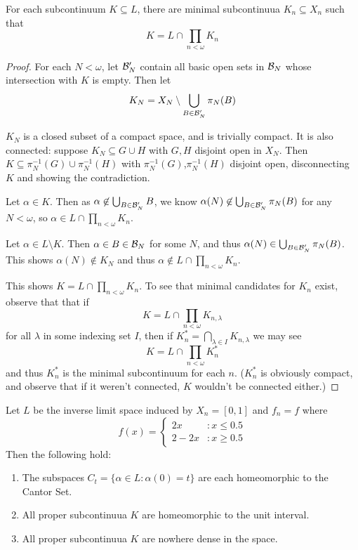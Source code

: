 \begin{lemma}\label{subcontinuua}
  For each subcontinuum $K\subseteq L$, there are minimal subcontinuua $K_n\subseteq X_n$ such that
    \[
      K = L \cap \prod_{n<\omega} K_n
    \]
\end{lemma}

\begin{proof}
  For each $N<\omega$, let $\mathcal{B}'_N$ contain all basic open sets in $\mathcal{B}_N$ whose intersection with $K$ is empty. Then let 
    \[
      K_N = X_N \setminus \bigcup_{B\in\mathcal{B}'_N} \pi_N(B)
    \]

  $K_N$ is a closed subset of a compact space, and is trivially compact. It is also connected: suppose $K_N\subseteq G\cup H$ with $G,H$ disjoint open in $X_N$. Then $K\subseteq \pi_N^{-1}(G)\cup\pi_N^{-1}(H)$ with $\pi_N^{-1}(G)$,$\pi_N^{-1}(H)$ disjoint open, disconnecting $K$ and showing the contradiction.

  Let $\alpha\in K$. Then as $\alpha\not\in \bigcup_{B\in\mathcal{B}'_N} B$, we know $\alpha(N)\not\in \bigcup_{B\in\mathcal{B}'_N} \pi_N(B)$ for any $N<\omega$, so $\alpha \in L \cap \prod_{n<\omega} K_n$.

  Let $\alpha\in L\setminus K$. Then $\alpha\in B \in \mathcal{B}_N$ for some $N$, and thus $\alpha(N)\in \bigcup_{B\in\mathcal{B}'_N} \pi_N(B)$. This shows $\alpha(N)\not\in K_N$ and thus $\alpha \not\in L \cap \prod_{n<\omega} K_n$.

  This shows $K = L \cap \prod_{n<\omega} K_n$. To see that minimal candidates for $K_n$ exist, observe that that if
    \[
      K = L \cap \prod_{n<\omega} K_{n,\lambda}
    \]
  for all $\lambda$ in some indexing set $I$, then if $K^*_n = \bigcap_{\lambda\in I} K_{n,\lambda}$ we may see
    \[
      K = L \cap \prod_{n<\omega} K^*_n
    \]
  and thus $K^*_n$ is the minimal subcontinuum for each $n$. ($K^*_n$ is obviously compact, and observe that if it weren't connected, $K$ wouldn't be connected either.)
\end{proof}

\begin{example}
Let $L$ be the inverse limit space induced by $X_n=[0,1]$ and $f_n=f$ where
\[
  f(x) = \left\{
     \begin{array}{lr}
       2x & : x \leq 0.5 \\
       2-2x & : x \geq 0.5
     \end{array}
   \right.
\]
Then the following hold:
  \begin{enumerate}
    \item The subspaces $C_t = \{\alpha\in L : \alpha(0)=t\}$ are each homeomorphic to the Cantor Set.
    \item All proper subcontinuua $K$ are homeomorphic to the unit interval.
    \item All proper subcontinuua $K$ are nowhere dense in the space.
  \end{enumerate}
\end{example}

